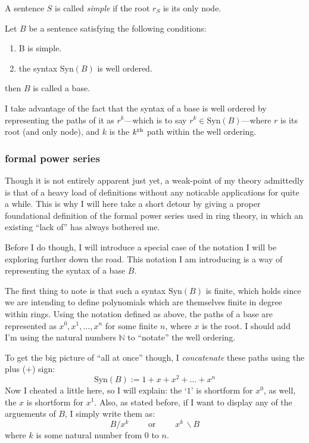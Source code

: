\documentclass[twoside]{article}
\newenvironment{definition}[1][Definition]{\begin{trivlist}
\item[\hskip \labelsep {\bfseries #1}]}{\end{trivlist}}
\begin{document}
A sentence $ S $ is called \emph{simple} if the root $ r_S $ is its only node.

\begin{definition}[Base]

Let $ B $ be a sentence satisfying the following conditions:

\begin{enumerate}

\item B is simple.

\item the syntax $ \mbox{Syn}(B) $ is well ordered.

\end{enumerate}
then $ B $ is called a base.

\end{definition}
I take advantage of the fact that the syntax of a base is well ordered by representing
the paths of it as $ r^k $---which is to say $ r^k\in\mbox{Syn}(B) $---where $ r $ is its root (and
only node), and $ k $ is the $ k^{\mbox{\scriptsize th}} $ path within the well ordering.

\subsubsection{formal power series}

Though it is not entirely apparent just yet, a weak-point of my theory admittedly is that of a heavy load
of definitions without any noticable applications for quite a while.  This is why I will here take a short
detour by giving a proper foundational definition of the formal power series used in ring theory, in which
an existing ``lack of'' has always bothered me.

Before I do though, I will introduce a special case of the notation I will be exploring further down the road.
This notation I am introducing is a way of representing the syntax of a base $ B $.

The first thing to note is that such a syntax $ \mbox{Syn}(B) $ is finite, which holds since we are intending to define
polynomials which are themselves finite in degree within rings.  Using the notation defined as above, the paths of a base
are represented as $ x^0, x^1,\ldots, x^n $ for some finite $ n $, where $ x $ is the root.  I should add I'm using
the natural numbers $ \mathbb{N} $ to ``notate'' the well ordering.

To get the big picture of ``all at once'' though, I \emph{concatenate} these paths using the plus ($ + $) sign:
$$ \mbox{Syn}(B):=1+x+x^2+\ldots+x^n $$
Now I cheated a little here, so I will explain: the `$ 1 $' is shortform for $ x^0 $, as well, the $ x $ is shortform
for $ x^1 $.  Also, as stated before, if I want to display any of the arguements of $ B $, I simply write them as:
$$ B/x^k\qquad\mbox{ or }\qquad x^k\,\backslash B $$
where $ k $ is some natural number from $ 0 $ to $ n $.
\end{document}
